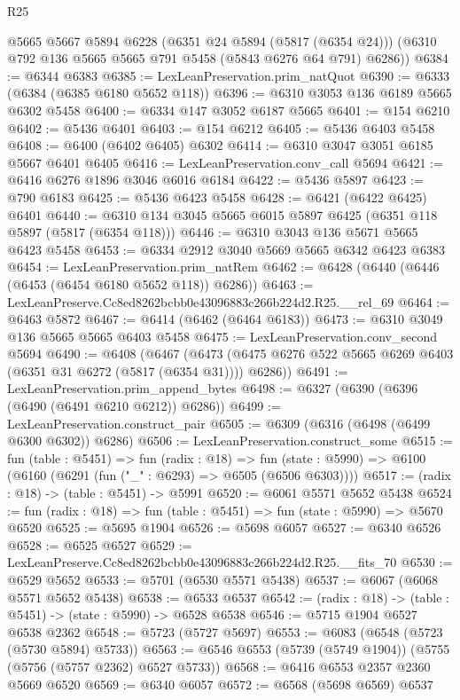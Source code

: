 \begin{lexlean}{R25}
\begin{coremodule}
      @5665
      @5667
      @5894
      @6228
      (@6351 @24 @5894 (@5817 (@6354 @24)))
      (@6310 @792 @136 @5665 @5665 @791 @5458 (@5843 @6276 @64 @791) @6286))
@6384 := @6344 @6383
@6385 := LexLeanPreservation.prim_natQuot
@6390 := @6333 (@6384 (@6385 @6180 @5652 @118))
@6396 := @6310 @3053 @136 @6189 @5665 @6302 @5458
@6400 := @6334 @147 @3052 @6187 @5665
@6401 := @154 @6210
@6402 := @5436 @6401
@6403 := @154 @6212
@6405 := @5436 @6403 @5458
@6408 := @6400 (@6402 @6405) @6302
@6414 := @6310 @3047 @3051 @6185 @5667 @6401 @6405
@6416 := LexLeanPreservation.conv_call @5694
@6421 := @6416 @6276 @1896 @3046 @6016 @6184
@6422 := @5436 @5897
@6423 := @790 @6183
@6425 := @5436 @6423 @5458
@6428 := @6421 (@6422 @6425) @6401
@6440 := @6310 @134 @3045 @5665 @6015 @5897 @6425 (@6351 @118 @5897 (@5817 (@6354 @118)))
@6446 := @6310 @3043 @136 @5671 @5665 @6423 @5458
@6453 := @6334 @2912 @3040 @5669 @5665 @6342 @6423 @6383
@6454 := LexLeanPreservation.prim_natRem
@6462 := @6428 (@6440 (@6446 (@6453 (@6454 @6180 @5652 @118)) @6286))
@6463 := LexLeanPreserve.Cc8ed8262bcbb0e43096883c266b224d2.R25.__rel_69
@6464 := @6463 @5872
@6467 := @6414 (@6462 (@6464 @6183))
@6473 := @6310 @3049 @136 @5665 @5665 @6403 @5458
@6475 := LexLeanPreservation.conv_second @5694
@6490 := @6408
    (@6467 (@6473 (@6475 @6276 @522 @5665 @6269 @6403 (@6351 @31 @6272 (@5817 (@6354 @31)))) @6286))
@6491 := LexLeanPreservation.prim_append_bytes
@6498 := @6327 (@6390 (@6396 (@6490 (@6491 @6210 @6212)) @6286))
@6499 := LexLeanPreservation.construct_pair
@6505 := @6309 (@6316 (@6498 (@6499 @6300 @6302)) @6286)
@6506 := LexLeanPreservation.construct_some
@6515 := fun (table : @5451) =>
  fun (radix : @18) =>
  fun (state : @5990) => @6100 (@6160 (@6291 (fun ("_" : @6293) => @6505 (@6506 @6303))))
@6517 := (radix : @18) -> (table : @5451) -> @5991
@6520 := @6061 @5571 @5652 @5438
@6524 := fun (radix : @18) => fun (table : @5451) => fun (state : @5990) => @5670 @6520
@6525 := @5695 @1904
@6526 := @5698 @6057
@6527 := @6340 @6526
@6528 := @6525 @6527
@6529 := LexLeanPreserve.Cc8ed8262bcbb0e43096883c266b224d2.R25.__fits_70
@6530 := @6529 @5652
@6533 := @5701 (@6530 @5571 @5438)
@6537 := @6067 (@6068 @5571 @5652 @5438)
@6538 := @6533 @6537
@6542 := (radix : @18) -> (table : @5451) -> (state : @5990) -> @6528 @6538
@6546 := @5715 @1904 @6527 @6538 @2362
@6548 := @5723 (@5727 @5697)
@6553 := @6083 (@6548 (@5723 (@5730 @5894) @5733))
@6563 := @6546 @6553 (@5739 (@5749 @1904)) (@5755 (@5756 (@5757 @2362) @6527 @5733))
@6568 := @6416 @6553 @2357 @2360 @5669 @6520
@6569 := @6340 @6057
@6572 := @6568 (@5698 @6569) @6537

\end{coremodule}
\end{lexlean}
